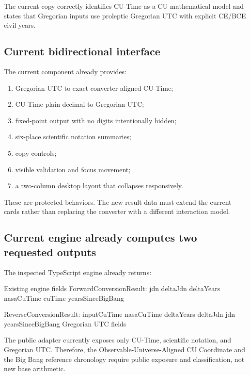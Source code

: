 \documentclass[11pt,letterpaper]{article}
\begin{document}
The current copy correctly identifies CU-Time as a CU mathematical model and
states that Gregorian inputs use proleptic Gregorian UTC with explicit CE/BCE
civil years.

\subsection{Current bidirectional interface}

The current component already provides:

\begin{enumerate}
    \item Gregorian UTC to exact converter-aligned CU-Time;
    \item CU-Time plain decimal to Gregorian UTC;
    \item fixed-point output with no digits intentionally hidden;
    \item six-place scientific notation summaries;
    \item copy controls;
    \item visible validation and focus movement;
    \item a two-column desktop layout that collapses responsively.
\end{enumerate}

These are protected behaviors. The new result data must extend the current cards
rather than replacing the converter with a different interaction model.

\subsection{Current engine already computes two requested outputs}

The inspected TypeScript engine already returns:

\begin{codebox}{Existing engine fields}
ForwardConversionResult:
  jdn
  deltaJdn
  deltaYears
  nasaCuTime
  cuTime
  yearsSinceBigBang

ReverseConversionResult:
  inputCuTime
  nasaCuTime
  deltaYears
  deltaJdn
  jdn
  yearsSinceBigBang
  Gregorian UTC fields
\end{codebox}

The public adapter currently exposes only CU-Time, scientific notation, and
Gregorian UTC. Therefore, the Observable-Universe-Aligned CU Coordinate and the
Big Bang reference chronology require public exposure and classification, not
new base arithmetic.
\end{document}
